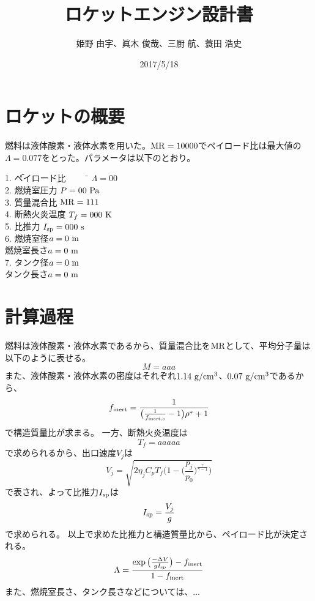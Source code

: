 \documentclass{jsarticle}
\begin{document}
\begin{titlepage}
\title{ロケットエンジン設計書}
\date{2017/5/18}
\author{姫野 由宇、眞木 俊哉、三厨 航、蓑田 浩史}
\maketitle
\thispagestyle{empty}
\end{titlepage}




\section{ロケットの概要}
燃料は液体酸素・液体水素を用いた。$\rm{MR}=10000$でペイロード比は最大値の$\Lambda = 0.077$をとった。パラメータは以下のとおり。

\begin{tabbing} 
1. \=ペイロード比 ~~~~ \= $\Lambda = 00$\\

2. \>燃焼室圧力 \> $P = 00 ~\rm{Pa}$\\

3. \>質量混合比 \>$\rm{MR}=111$\\

4. \>断熱火炎温度 \>$T_f = 000 ~ \rm{K}$\\

5. \>比推力 \>$I_{\rm{sp}}= 000 ~\rm{s}$\\

6. \>燃焼室径\>$a = 0 ~ \rm{m}$\\

\>燃焼室長さ\>$a = 0 ~ \rm{m}$\\

7. \>タンク径\>$a = 0 ~ \rm{m}$\\

\>タンク長さ\>$a = 0 ~ \rm{m}$\\
\end{tabbing} 

\section{計算過程}
燃料は液体酸素・液体水素であるから、質量混合比を$\rm{MR}$として、平均分子量は以下のように表せる。
\[
M = aaa
\]
また、液体酸素・液体水素の密度はそれぞれ$1.14 ~ \rm{g/cm^3}$、$0.07 ~ \rm{g/cm^3}$であるから、
\[
f_{\rm{inert}} = \frac{1}{\big(\frac{1}{f_{\rm{inert,s}}}-1\big)\rho^*+1}
\]
で構造質量比が求まる。
一方、断熱火炎温度は
\[
T_f = aaaaa
\]
で求められるから、出口速度$V_j$は
\[
V_j = \sqrt{2\eta_j C_p T_f \Big( 1-\Big( \frac{p_j}{p_0}\Big)^{\frac{\gamma}{\gamma-1}} \Big)}
\]
で表され、よって比推力$I_{\rm{sp}}$は
\[
I_{\rm{sp}} = \frac{V_j}{g}
\]
で求められる。
以上で求めた比推力と構造質量比から、ペイロード比が決定される。
\[
\Lambda = \frac{\exp \big( {\frac{-\Delta V}{gI_{\rm{sp} } }}\big)-f_{\rm{inert}}}{1-f_{\rm{inert}}}
\]
また、燃焼室長さ、タンク長さなどについては、...
\end{document}

